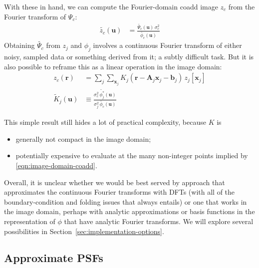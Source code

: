 \documentclass[DM,authoryear,toc]{lsstdoc}
\begin{document}
With these in hand, we can compute the Fourier-domain coadd image $z_c$ from the Fourier transform of $\Psi_c$:
\begin{align}
    \widetilde{z_c}(\symbf{u})
        &= \frac{\widetilde{\Psi_c}(\symbf{u}) \, \sigma_c^2}{\widetilde{\phi_c}(\symbf{u})}
\end{align}
Obtaining $\widetilde{\Psi_c}$ from $z_j$ and $\phi_j$ involves a continuous Fourier transform of either noisy, sampled data or something derived from it; a subtly difficult task.
But it is also possible to reframe this as a linear operation in the image domain:
\begin{align}
    z_c(\symbf{r}) &= \sum_j \sum_{\symbf{x}_j} K_j\left(\symbf{r} - \symbf{A}_j\symbf{x}_j - \symbf{b}_j\right)
        \, z_j[\symbf{x}_j] \label{eqn:image-domain-coadd} \\
    \widetilde{K}_j(\symbf{u}) &\equiv
        \frac{
            \sigma_c^2 \, \widetilde{\phi_j^\ast}(\symbf{u})
        }{
            \sigma_j^2 \, \widetilde{\phi_c}(\symbf{u})
        }
\end{align}

This simple result still hides a lot of practical complexity, because $K$ is
\begin{itemize}
    \item generally not compact in the image domain;
    \item potentially expensive to evaluate at the many non-integer points implied by \ref{eqn:image-domain-coadd}.
\end{itemize}

Overall, it is unclear whether we would be best served by approach that approximates the continuous Fourier transforms with DFTs (with all of the boundary-condition and folding issues that always entails) or one that works in the image domain, perhaps with analytic approximations or basis functions in the representation of $\phi$ that have analytic Fourier transforms.
We will explore several possibilities in Section~\ref{sec:implementation-options}.

\subsection{Approximate PSFs}
\end{document}
